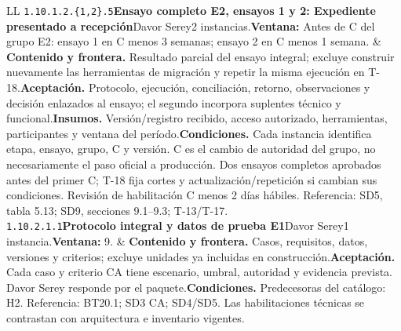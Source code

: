 \begin{longtable}{L{\tabcolsep\relax}L{\tabcolsep\relax}}
\texttt{1.\allowbreak{}10.\allowbreak{}1.\allowbreak{}2.\allowbreak{}\{1,\allowbreak{}2\}.\allowbreak{}5}\newline{}\textbf{Ensayo completo E2, ensayos 1 y 2: Expediente presentado a recepción}\newline{}Davor Serey\newline{}2 instancias.\newline{}\textbf{Ventana:} Antes de C del grupo E2: ensayo 1 en C menos 3 semanas; ensayo 2 en C menos 1 semana. & \textbf{Contenido y frontera.} Resultado parcial del ensayo integral; excluye construir nuevamente las herramientas de migración y repetir la misma ejecución en T-18.\newline{}\textbf{Aceptación.} Protocolo, ejecución, conciliación, retorno, observaciones y decisión enlazados al ensayo; el segundo incorpora suplentes técnico y funcional.\newline{}\textbf{Insumos.} Versión/registro recibido, acceso autorizado, herramientas, participantes y ventana del período.\newline{}\textbf{Condiciones.} Cada instancia identifica etapa, ensayo, grupo, C y versión. C es el cambio de autoridad del grupo, no necesariamente el paso oficial a producción. Dos ensayos completos aprobados antes del primer C; T-18 fija cortes y actualización/repetición si cambian sus condiciones. Revisión de habilitación C menos 2 días hábiles. Referencia: SD5, tabla 5.13; SD9, secciones 9.1--9.3; T-13/T-17.\\\hline
\texttt{1.\allowbreak{}10.\allowbreak{}2.\allowbreak{}1.\allowbreak{}1}\newline{}\textbf{Protocolo integral y datos de prueba E1}\newline{}Davor Serey\newline{}1 instancia.\newline{}\textbf{Ventana:} 9. & \textbf{Contenido y frontera.} Casos, requisitos, datos, versiones y criterios; excluye unidades ya incluidas en construcción.\newline{}\textbf{Aceptación.} Cada caso y criterio CA tiene escenario, umbral, autoridad y evidencia prevista. Davor Serey responde por el paquete.\newline{}\textbf{Condiciones.} Predecesoras del catálogo: H2. Referencia: BT20.1; SD3 CA; SD4/SD5. Las habilitaciones técnicas se contrastan con arquitectura e inventario vigentes.\\\hline

\end{longtable}
